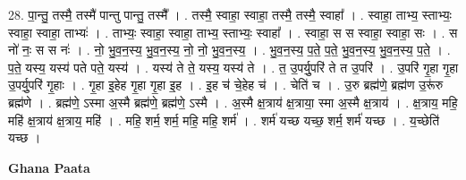 \documentclass[17pt]{extarticle}
\begin{document}
28. पा॒न्तु॒ तस्मै॒ तस्मै॑ पान्तु पान्तु॒ तस्मै᳚ । . तस्मै॒ स्वाहा॒ स्वाहा॒ तस्मै॒ तस्मै॒ स्वाहा᳚ । . स्वाहा॒ ताभ्य॒ स्ताभ्यः॒ स्वाहा॒ स्वाहा॒ ताभ्यः॑ । . ताभ्यः॒ स्वाहा॒ स्वाहा॒ ताभ्य॒ स्ताभ्यः॒ स्वाहा᳚ । . स्वाहा॒ स स स्वाहा॒ स्वाहा॒ सः । . स नो॑ नः॒ स स नः॑ । . नो॒ भु॒व॒न॒स्य॒ भु॒व॒न॒स्य॒ नो॒ नो॒ भु॒व॒न॒स्य॒ । . भु॒व॒न॒स्य॒ प॒ते॒ प॒ते॒ भु॒व॒न॒स्य॒ भु॒व॒न॒स्य॒ प॒ते॒ । . प॒ते॒ यस्य॒ यस्य॑ पते पते॒ यस्य॑ । . यस्य॑ ते ते॒ यस्य॒ यस्य॑ ते । . त॒ उ॒पर्यु॒परि॑ ते त उ॒परि॑ । . उ॒परि॑ गृ॒हा गृ॒हा उ॒पर्यु॒परि॑ गृ॒हाः । . गृ॒हा इ॒हेह गृ॒हा गृ॒हा इ॒ह । . इ॒ह च॑ चे॒हेह च॑ । . चेति॑ च । . उ॒रु ब्रह्म॑णे॒ ब्रह्म॑ण उ॒रू॑रु ब्रह्म॑णे । . ब्रह्म॑णे॒ ऽस्मा अ॒स्मै ब्रह्म॑णे॒ ब्रह्म॑णे॒ ऽस्मै । . अ॒स्मै क्ष॒त्राय॑ क्ष॒त्राया॒ स्मा अ॒स्मै क्ष॒त्राय॑ । . क्ष॒त्राय॒ महि॒ महि॑ क्ष॒त्राय॑ क्ष॒त्राय॒ महि॑ । . महि॒ शर्म॒ शर्म॒ महि॒ महि॒ शर्म॑ । . शर्म॑ यच्छ यच्छ॒ शर्म॒ शर्म॑ यच्छ । . य॒च्छेति॑ यच्छ । \newline

\textbf{Ghana Paata } \newline
\end{document}
